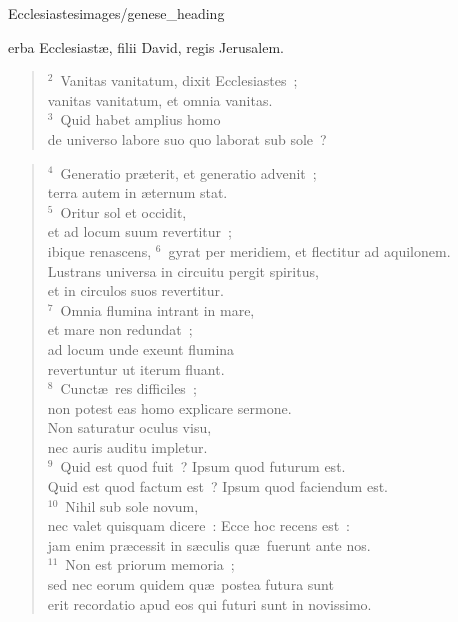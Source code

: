 {Ecclesiastes}{images/genese_heading}


\bchapter
{}erba Ecclesiast\ae , filii David, regis Jerusalem.
\begin{verse}${}^{2}$~Vanitas vanitatum, dixit Ecclesiastes~;\\ vanitas vanitatum, et omnia vanitas.\\
${}^{3}$~Quid habet amplius homo\\ de universo labore suo quo laborat sub sole~?\end{verse}


\begin{verse}${}^{4}$~Generatio pr\ae terit, et generatio advenit~;\\ terra autem in \ae ternum stat.\\
${}^{5}$~Oritur sol et occidit,\\ et ad locum suum revertitur~;\\ ibique renascens,
${}^{6}$~gyrat per meridiem, et flectitur ad aquilonem.\\ Lustrans universa in circuitu pergit spiritus,\\ et in circulos suos revertitur.\\
${}^{7}$~Omnia flumina intrant in mare,\\ et mare non redundat~;\\ ad locum unde exeunt flumina\\ revertuntur ut iterum fluant.\\
${}^{8}$~Cunct\ae\ res difficiles~;\\ non potest eas homo explicare sermone.\\ Non saturatur oculus visu,\\ nec auris auditu impletur.\\
${}^{9}$~Quid est quod fuit~? Ipsum quod futurum est.\\ Quid est quod factum est~? Ipsum quod faciendum est.\\
${}^{10}$~Nihil sub sole novum,\\ nec valet quisquam dicere~: Ecce hoc recens est~:\\ jam enim pr\ae cessit in s\ae culis qu\ae\ fuerunt ante nos.\\
${}^{11}$~Non est priorum memoria~;\\ sed nec eorum quidem qu\ae\ postea futura sunt\\ erit recordatio apud eos qui futuri sunt in novissimo.\end{verse}


